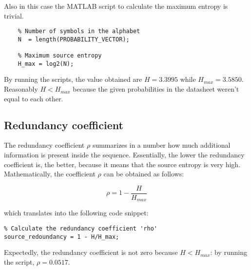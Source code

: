 \noindent Also in this case the MATLAB script to calculate the maximum entropy is trivial.

\begin{lstlisting}
    % Number of symbols in the alphabet
    N  = length(PROBABILITY_VECTOR);

    % Maximum source entropy
    H_max = log2(N);
\end{lstlisting}

\noindent By running the scripts, the value obtained are $H = 3.3995$ while $H_{max} = 3.5850$. Reasonably $H < H_{max}$ because the given probabilities in the datasheet weren't equal to each other.

% 
\subsection{Redundancy coefficient}

The redundancy coefficient $\rho$ summarizes in a number how much additional information is present inside the sequence. Essentially, the lower the redundancy coefficient is, the better, because it means that the source entropy is very high. Mathematically, the coefficient $\rho$ can be obtained as follows:

\begin{equation*}
    \rho = 1 - \frac{H}{H_{max}}    
\end{equation*}

\noindent which translates into the following code snippet:

\begin{lstlisting}
% Calculate the redundancy coefficient 'rho'
source_redoundancy = 1 - H/H_max;
\end{lstlisting}

\noindent Expectedly, the redundancy coefficient is not zero because $H<H_{max}$: by running the script, $\rho = 0.0517$.



